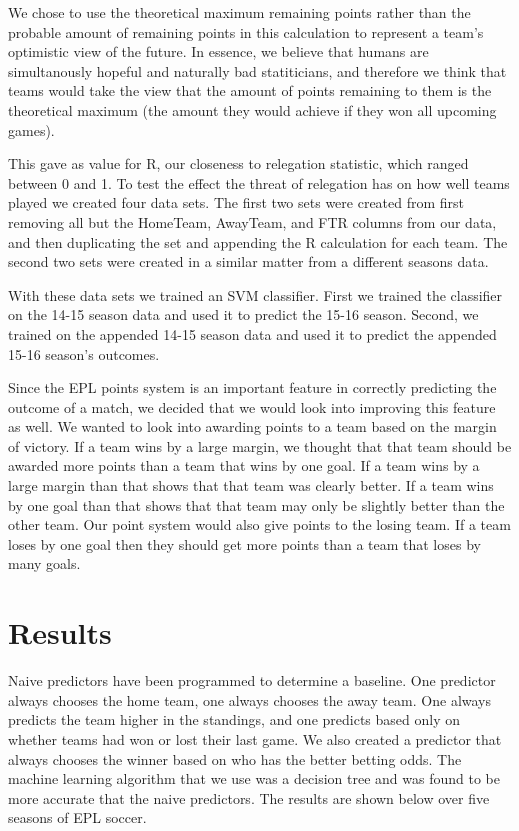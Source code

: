 \documentclass[conference]{IEEEtran}
\begin{document}
We chose to use the theoretical maximum remaining points rather than the probable amount of remaining points in this calculation to represent a team's optimistic view of the future. In essence, we believe that humans are simultanously hopeful and naturally bad statiticians, and therefore we think that teams would take the view that the amount of points remaining to them is the theoretical maximum (the amount they would achieve if they won all upcoming games). 

This gave as value for R, our closeness to relegation statistic, which ranged between 0 and 1. To test the effect the threat of relegation has on how well teams played we created four data sets. The first two sets were created from first removing all but the HomeTeam, AwayTeam, and FTR columns from our data, and then duplicating the set and appending the R calculation for each team. The second two sets were created in a similar matter from a different seasons data.

With these data sets we trained an SVM classifier. First we trained the classifier on the 14-15 season data and used it to predict the 15-16 season. Second, we trained on the appended 14-15 season data and used it to predict the appended 15-16 season's outcomes.

Since the EPL points system is an important feature in correctly predicting the outcome of a match, we decided that we would look into improving this feature as well. We wanted to look into awarding points to a team based on the margin of victory. If a team wins by a large margin, we thought that that team should be awarded more points than a team that wins by one goal. If a team wins by a large margin than that shows that that team was clearly better. If a team wins by one goal than that shows that that team may only be slightly better than the other team. Our point system would also give points to the losing team. If a team loses by one goal then they should get more points than a team that loses by many goals.

\section{Results}

 Naive predictors have been programmed to determine a baseline. One predictor always chooses the home team, one always chooses the away team. One always predicts the team higher in the standings, and one predicts based only on whether teams had won or lost their last game. We also created a predictor that always chooses the winner based on who has the better betting odds. The machine learning algorithm that we use was a decision tree and was found to be more accurate that the naive predictors. The results are shown below over five seasons of EPL soccer.
\end{document}

